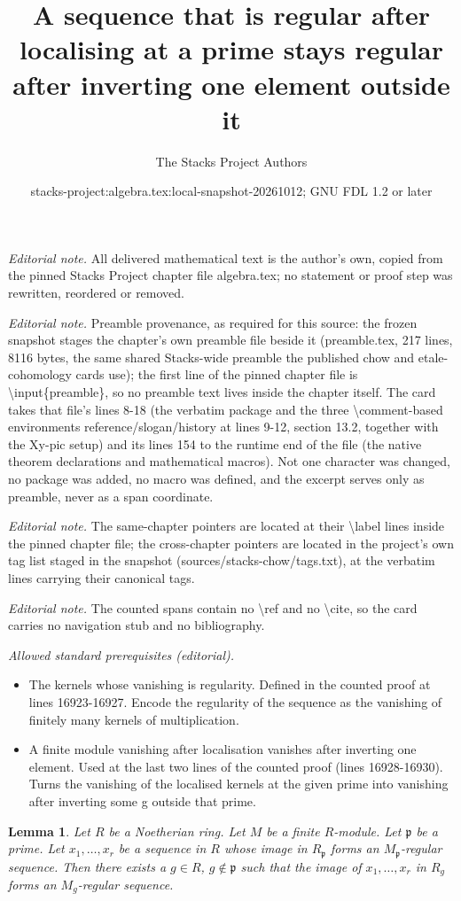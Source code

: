 \documentclass[10pt,a4paper]{amsart}
\title{A sequence that is regular after localising at a prime stays regular after inverting one element outside it}
\author{The Stacks Project Authors}
\date{stacks-project:algebra.tex:local-snapshot-20261012; GNU FDL 1.2 or later}
\theoremstyle{plain}
\newtheorem{lemma}[subsection]{Lemma}
\theoremstyle{definition}
\theoremstyle{remark}
\numberwithin{equation}{subsection}
\begin{document}
\maketitle
\noindent\textit{Editorial note.} All delivered mathematical text is the author's own, copied from the pinned Stacks Project chapter file algebra.tex; no statement or proof step was rewritten, reordered or removed.\par\medskip
\noindent\textit{Editorial note.} Preamble provenance, as required for this source: the frozen snapshot stages the chapter's own preamble file beside it (preamble.tex, 217 lines, 8116 bytes, the same shared Stacks-wide preamble the published chow and etale-cohomology cards use); the first line of the pinned chapter file is \textbackslash{}input\{preamble\}, so no preamble text lives inside the chapter itself. The card takes that file's lines 8-18 (the verbatim package and the three \textbackslash{}comment-based environments reference/slogan/history at lines 9-12, section 13.2, together with the Xy-pic setup) and its lines 154 to the runtime end of the file (the native theorem declarations and mathematical macros). Not one character was changed, no package was added, no macro was defined, and the excerpt serves only as preamble, never as a span coordinate.\par\medskip
\noindent\textit{Editorial note.} The same-chapter pointers are located at their \textbackslash{}label lines inside the pinned chapter file; the cross-chapter pointers are located in the project's own tag list staged in the snapshot (sources/stacks-chow/tags.txt), at the verbatim lines carrying their canonical tags.\par\medskip
\noindent\textit{Editorial note.} The counted spans contain no \textbackslash{}ref and no \textbackslash{}cite, so the card carries no navigation stub and no bibliography.\par\medskip
\noindent\textit{Allowed standard prerequisites (editorial).}\begin{itemize}
\item The kernels whose vanishing is regularity. Defined in the counted proof at lines 16923-16927. Encode the regularity of the sequence as the vanishing of finitely many kernels of multiplication.
\item A finite module vanishing after localisation vanishes after inverting one element. Used at the last two lines of the counted proof (lines 16928-16930). Turns the vanishing of the localised kernels at the given prime into vanishing after inverting some g outside that prime.
\end{itemize}\medskip
\begin{lemma}
\label{lemma-regular-sequence-in-neighbourhood}
Let $R$ be a Noetherian ring. Let $M$ be a finite $R$-module.
Let $\mathfrak p$ be a prime. Let $x_1, \ldots, x_r$ be a sequence
in $R$ whose image in $R_{\mathfrak p}$ forms an $M_{\mathfrak p}$-regular
sequence. Then there exists a $g \in R$, $g \not \in \mathfrak p$
such that the image of $x_1, \ldots, x_r$ in $R_g$ forms
an $M_g$-regular sequence.
\end{lemma}
\end{document}
